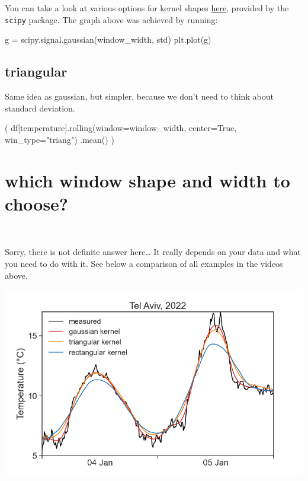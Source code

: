\documentclass[
  letterpaper,
  DIV=11,
  numbers=noendperiod,
  oneside]{scrreprt}
\newenvironment{Shaded}{\begin{snugshade}}{\end{snugshade}}
\newcommand{\NormalTok}[1]{\textcolor[rgb]{0.00,0.23,0.31}{#1}}
\newcommand{\OperatorTok}[1]{\textcolor[rgb]{0.37,0.37,0.37}{#1}}
\newcommand{\StringTok}[1]{\textcolor[rgb]{0.13,0.47,0.30}{#1}}
\newcommand{\VariableTok}[1]{\textcolor[rgb]{0.07,0.07,0.07}{#1}}
\begin{document}
You can take a look at various options for kernel shapes
\href{https://docs.scipy.org/doc/scipy/reference/signal.windows.html\#module-scipy.signal.windows}{here},
provided by the \texttt{scipy} package. The graph above was achieved by
running:

\begin{Shaded}
\begin{Highlighting}[]
\NormalTok{g }\OperatorTok{=}\NormalTok{ scipy.signal.gaussian(window\_width, std)}
\NormalTok{plt.plot(g)}
\end{Highlighting}
\end{Shaded}

\hypertarget{triangular}{%
\subsection{triangular}\label{triangular}}

Same idea as gaussian, but simpler, because we don't need to think about
standard deviation.

\begin{Shaded}
\begin{Highlighting}[]
\NormalTok{(}
\NormalTok{df[}\StringTok{\textquotesingle{}temperature\textquotesingle{}}\NormalTok{].rolling(window}\OperatorTok{=}\NormalTok{window\_width,}
\NormalTok{                          center}\OperatorTok{=}\VariableTok{True}\NormalTok{,}
\NormalTok{                          win\_type}\OperatorTok{=}\StringTok{"triang"}\NormalTok{)}
\NormalTok{                 .mean()}
\NormalTok{)}
\end{Highlighting}
\end{Shaded}

\hypertarget{which-window-shape-and-width-to-choose}{%
\section{which window shape and width to
choose?}\label{which-window-shape-and-width-to-choose}}

🤷‍♂️

Sorry, there is not definite answer here\ldots{} It really depends on
your data and what you need to do with it. See below a comparison of all
examples in the videos above.

\includegraphics{smoothing/kernel_comparison.png}
\end{document}

